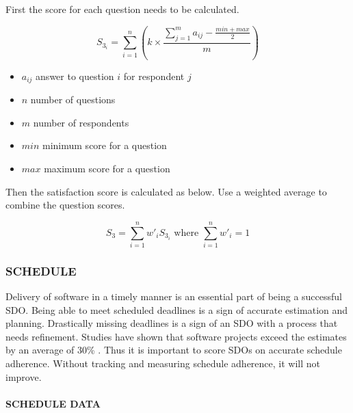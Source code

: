 \documentclass[SDSUThesis.tex]{subfiles}
\begin{document}
                First the score for each question needs to be calculated.
                
                \[
                    S_{3_i} = \sum^n_{i=1}\left( k \times \frac{ \sum^m_{j=1}a_{ij}-\frac{min + max}{2}}{m} \right)
                \]
                
                \begin{itemize}
                    \item $a_{ij}$ answer to question $i$ for respondent $j$
                    \item $n$ number of questions
                    \item $m$ number of respondents
                    \item $min$ minimum score for a question
                    \item $max$ maximum score for a question
                \end{itemize}
                
                Then the satisfaction score is calculated as below.  Use a weighted average
                to combine the question scores.
                
                \[
                    S_{3} = \sum\limits^n_{i=1} w'_i S_{3_i} \text{ where } \sum\limits^n_{i=1} w'_i = 1
                \]

        \subsubsection{SCHEDULE}  
            Delivery of software in a timely manner is an essential part of being a 
            successful SDO.  Being able to meet scheduled deadlines is a sign of accurate
            estimation and planning.  Drastically missing deadlines is a sign of an SDO
            with a process that needs refinement.  Studies have shown that 
            software projects exceed the estimates by an average of
            30\% \cite{Jorgensen2014}.  Thus it is important to score SDOs on accurate
            schedule adherence. Without tracking and measuring schedule adherence, it will
            not improve.  
            
            \paragraph{SCHEDULE DATA}
            
\end{document}
